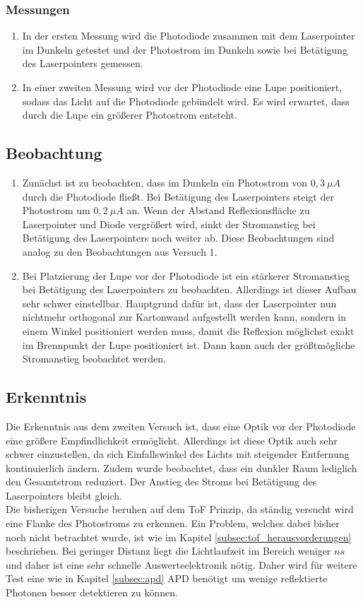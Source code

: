 \subsubsection{Messungen}
\begin{enumerate}
	\item In der ersten Messung wird die Photodiode zusammen mit dem Laserpointer im Dunkeln getestet und der Photostrom im Dunkeln sowie bei Betätigung des Laserpointers gemessen.
	\item In einer zweiten Messung wird vor der Photodiode eine Lupe positioniert, sodass das Licht auf die Photodiode gebündelt wird. Es wird erwartet, dass durch die Lupe ein größerer Photostrom entsteht.
\end{enumerate}
\subsection{Beobachtung}
\begin{enumerate}
	\item Zunächst ist zu beobachten, dass im Dunkeln ein Photostrom von $0,3\:\mu A$ durch die Photodiode fließt. Bei Betätigung des Laserpointers steigt der Photostrom um $0,2\:\mu A$ an. Wenn der Abstand Reflexionsfläche zu Laserpointer und Diode vergrößert wird, sinkt der Stromanstieg bei Betätigung des Laserpointers noch weiter ab. Diese Beobachtungen sind analog zu den Beobachtungen aus Versuch 1.
	\item Bei Platzierung der Lupe vor der Photodiode ist ein stärkerer Stromanstieg bei Betätigung des Laserpointers zu beobachten. Allerdings ist dieser Aufbau sehr schwer einstellbar. Hauptgrund dafür ist, dass der Laserpointer nun nichtmehr orthogonal zur Kartonwand aufgestellt werden kann, sondern in einem Winkel positioniert werden muss, damit die Reflexion möglichst exakt im Brennpunkt der Lupe positioniert ist. Dann kann auch der größtmögliche Stromanstieg beobachtet werden. 
\end{enumerate}
\subsection{Erkenntnis}
Die Erkenntnis aus dem zweiten Versuch ist, dass eine Optik vor der Photodiode eine größere Empfindlichkeit ermöglicht. Allerdings ist diese Optik auch sehr schwer einzustellen, da sich Einfallswinkel des Lichts mit steigender Entfernung kontinuierlich ändern. Zudem wurde beobachtet, dass ein dunkler Raum lediglich den Gesamtstrom reduziert. Der Anstieg des Stroms bei Betätigung des Laserpointers bleibt gleich.\\
Die bisherigen Versuche beruhen auf dem \ac{ToF} Prinzip, da ständig versucht wird eine Flanke des Photostroms zu erkennen. Ein Problem, welches dabei bisher noch nicht betrachtet wurde, ist wie im Kapitel \ref{subsec:tof_herausvorderungen} beschrieben. Bei geringer Distanz liegt die Lichtlaufzeit im Bereich weniger $ns$ und daher ist eine sehr schnelle Auswerteelektronik nötig. Daher wird für weitere Test eine wie in Kapitel \ref{subsec:apd} \ac{APD} benötigt um wenige reflektierte Photonen besser detektieren zu können.
